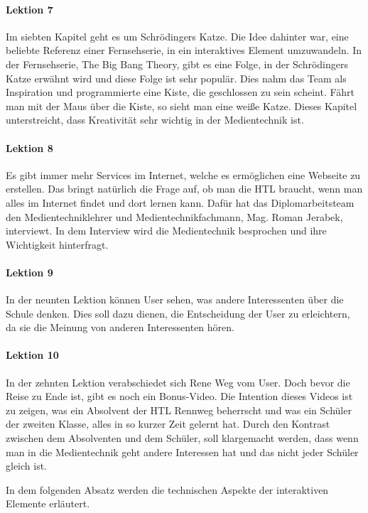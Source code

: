\paragraph{Lektion 7}
Im siebten Kapitel geht es um Schrödingers Katze. Die Idee dahinter war, eine beliebte Referenz einer Fernsehserie, in ein interaktives Element umzuwandeln. In der Fernsehserie, The Big Bang Theory, gibt es eine Folge, in der Schrödingers Katze erwähnt wird und diese Folge ist sehr populär. Dies nahm das Team als Inspiration und programmierte eine Kiste, die geschlossen zu sein scheint. Fährt man mit der Maus über die Kiste, so sieht man eine weiße Katze. Dieses Kapitel unterstreicht, dass Kreativität sehr wichtig in der Medientechnik ist.

\paragraph{Lektion 8}
Es gibt immer mehr Services im Internet, welche es ermöglichen eine Webseite zu erstellen. Das bringt natürlich die Frage auf, ob man die HTL braucht, wenn man alles im Internet findet und dort lernen kann. Dafür hat das Diplomarbeitsteam den Medientechniklehrer und Medientechnikfachmann, Mag. Roman Jerabek, interviewt. In dem Interview wird die Medientechnik besprochen und ihre Wichtigkeit hinterfragt.

\paragraph{Lektion 9}
In der neunten Lektion können User sehen, was andere Interessenten über die Schule denken. Dies soll dazu dienen, die Entscheidung der User zu erleichtern, da sie die Meinung von anderen Interessenten hören.

\paragraph{Lektion 10}
In der zehnten Lektion verabschiedet sich Rene Weg vom User. Doch bevor die Reise zu Ende ist, gibt es noch ein Bonus-Video. Die Intention dieses Videos ist zu zeigen, was ein Absolvent der HTL Rennweg beherrscht und was ein Schüler der zweiten Klasse, alles in so kurzer Zeit gelernt hat. Durch den Kontrast zwischen dem Absolventen und dem Schüler, soll klargemacht werden, dass wenn man in die Medientechnik geht andere Interessen hat und das nicht jeder Schüler gleich ist.

In dem folgenden Absatz werden die technischen Aspekte der interaktiven Elemente erläutert.


